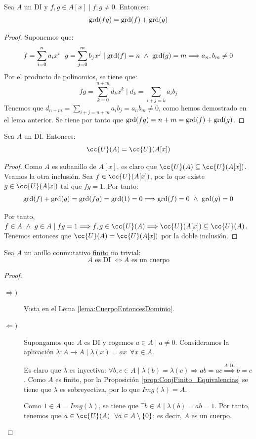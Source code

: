 \begin{lema}
    \label{lema:GradoProductoDI}
    Sea $A$ un DI y $f,g \in A[x] \mid f,g \neq 0$. Entonces:
    $$\operatorname{grd}(fg) = \operatorname{grd}(f) + \operatorname{grd}(g)$$
\end{lema}
\begin{proof}
    Suponemos que:
    $$f= \sum_{i=0}^n a_i x^i~~g = \sum_{j=0}^m b_j x^j \mid \operatorname{grd}(f) = n \ \land \  \operatorname{grd}(g) = m \Longrightarrow a_n, b_m \neq 0$$
    Por el producto de polinomios, se tiene que:
    $$fg = \sum_{k=0}^{n+m} d_k x^k \mid d_k = \sum_{i+j=k} a_i b_j$$
    Tenemos que $\displaystyle d_{n+m} = \sum_{i+j=n+m} a_ib_j = a_n b_m \neq 0$, como hemos demostrado en el lema anterior. Se tiene por tanto que $\operatorname{grd}(fg) = n+m = \operatorname{grd}(f) + \operatorname{grd}(g)$.
\end{proof}

\begin{prop}
    Sea $A$ un DI. Entonces:
    $$\cc{U}(A) = \cc{U}(A[x])$$
\end{prop}
\begin{proof}
    Como $A$ es subanillo de $A[x]$, es claro que $\cc{U}(A) \subseteq \cc{U}(A[x])$. Veamos la otra inclusión. Sea $f \in \cc{U}(A[x])$, por lo que existe $g \in \cc{U}(A[x])$ tal que $fg = 1$. Por tanto:
    $$\operatorname{grd}(f) + \operatorname{grd}(g) = \operatorname{grd}(fg) = \operatorname{grd}(1) = 0 \Longrightarrow \operatorname{grd}(f) = 0 \ \land \  \operatorname{grd}(g) = 0$$
    
    Por tanto, $f \in A \y g \in A \mid fg = 1 \Longrightarrow f,g \in \cc{U}(A) \Longrightarrow \cc{U}(A[x]) \subseteq \cc{U}(A)$.\\
    
    Tenemos entonces que $\cc{U}(A) = \cc{U}(A[x])$ por la doble inclusión.
\end{proof}

\begin{prop}
    Sea $A$ un anillo conmutativo \ul{finito} no trivial:
    $$A \text{ es DI } \Longleftrightarrow A \text{ es un cuerpo}$$
\end{prop}
\begin{proof}\
\begin{description}
    \item[$\Longrightarrow)$] Vista en el Lema \ref{lema:CuerpoEntoncesDominio}.

    \item[$\Longleftarrow)$] Supongamos que $A$ es DI y cogemos $a \in A \mid a \neq 0$. Consideramos la aplicación $\lambda:A\rightarrow A \mid \lambda(x) = ax~~\forall x \in A$.
    
    Es claro que $\lambda$ es inyectiva: $\forall b,c \in A \mid \lambda(b) = \lambda(c) \Longrightarrow ab = ac \stackrel{\text{$A$ DI}}{\Longrightarrow} b=c$.
    Como $A$ es finito, por la Proposición \ref{prop:ConjFinito_Equivalencias} se tiene que $\lambda$ es sobreyectiva, por lo que $Img(\lambda)=A$.

    Como $1 \in A = Img(\lambda)$, se tiene que $\exists b \in A \mid \lambda(b) = ab = 1$. Por tanto, tenemos que $ a \in \cc{U}(A)~~\forall a \in A \setminus \{0\}$; es decir, $A$ es un cuerpo.
\end{description}
\end{proof}

